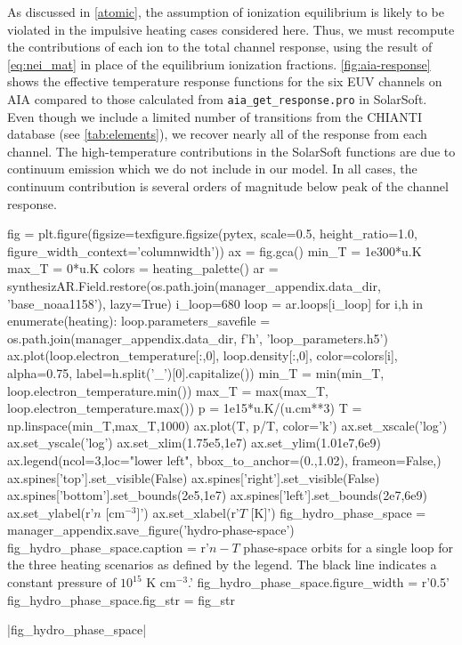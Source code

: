 As discussed in \autoref{atomic}, the assumption of ionization equilibrium is likely to be violated in the impulsive heating cases considered here. Thus, we must recompute the contributions of each ion to the total channel response, using the result of \autoref{eq:nei_mat} in place of the equilibrium ionization fractions. \autoref{fig:aia-response} shows the effective temperature response functions for the six EUV channels on AIA compared to those calculated from \texttt{aia\_get\_response.pro} in SolarSoft. Even though we include a limited number of transitions from the CHIANTI database (see \autoref{tab:elements}), we recover nearly all of the response from each channel. The high-temperature contributions in the SolarSoft functions are due to continuum emission which we do not include in our model. In all cases, the continuum contribution is several orders of magnitude below peak of the channel response.

\begin{pycode}
fig = plt.figure(figsize=texfigure.figsize(pytex, scale=0.5, height_ratio=1.0, 
                                           figure_width_context='columnwidth'))
ax = fig.gca()
min_T = 1e300*u.K
max_T = 0*u.K
colors = heating_palette()
ar = synthesizAR.Field.restore(os.path.join(manager_appendix.data_dir, 'base_noaa1158'), lazy=True)
i_loop=680
loop = ar.loops[i_loop]
for i,h in enumerate(heating):
    loop.parameters_savefile = os.path.join(manager_appendix.data_dir, f'{h}', 'loop_parameters.h5')
    ax.plot(loop.electron_temperature[:,0], loop.density[:,0], color=colors[i], alpha=0.75,
            label=h.split('_')[0].capitalize())
    min_T = min(min_T, loop.electron_temperature.min())
    max_T = max(max_T, loop.electron_temperature.max())
p = 1e15*u.K/(u.cm**3)
T = np.linspace(min_T,max_T,1000)
ax.plot(T, p/T, color='k')
ax.set_xscale('log')
ax.set_yscale('log')
ax.set_xlim(1.75e5,1e7)
ax.set_ylim(1.01e7,6e9)
ax.legend(ncol=3,loc="lower left", bbox_to_anchor=(0.,1.02), frameon=False,)
ax.spines['top'].set_visible(False)
ax.spines['right'].set_visible(False)
ax.spines['bottom'].set_bounds(2e5,1e7)
ax.spines['left'].set_bounds(2e7,6e9)
ax.set_ylabel(r'$n$ [cm$^{-3}$]')
ax.set_xlabel(r'$T$ [K]')
fig_hydro_phase_space = manager_appendix.save_figure('hydro-phase-space')
fig_hydro_phase_space.caption = r'$n-T$ phase-space orbits for a single loop for the three heating scenarios as defined by the legend. The black line indicates a constant pressure of $10^{15}$ K cm$^{-3}$.'
fig_hydro_phase_space.figure_width = r'0.5\columnwidth'
fig_hydro_phase_space.fig_str = fig_str
\end{pycode}
|fig_hydro_phase_space|

